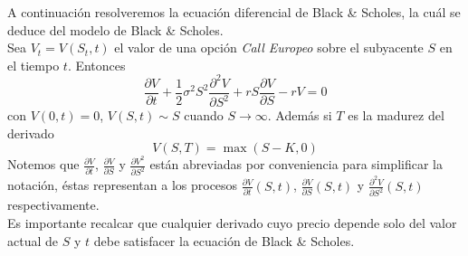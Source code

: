 \documentclass[11pt,notitlepage]{article}
\begin{document}
        A continuación resolveremos la ecuación diferencial de Black \& Scholes, la cuál se deduce del modelo de Black \& Scholes.\\
Sea $V_t = V(S_t, t)$ el valor de una opción \textit{Call Europeo} sobre el subyacente $S$ en el tiempo $t$. Entonces
\begin{equation}
    \label{eq:bs}
    \frac{\partial V}{\partial t} + \frac{1}{2} \sigma^2 S^2 \frac{\partial^2 V}{\partial S^2} + r S \frac{\partial V}{\partial S} - rV = 0
\end{equation}
con $V(0, t) = 0$, $V(S,t) \sim S$ cuando $S \to \infty$. Además si $T$ es la madurez del derivado $$V(S,T) = \max(S-K, 0)$$ 
Notemos que $\frac{\partial V}{\partial t}$, $\frac{\partial V}{\partial S}$ y $\frac{\partial V^2}{\partial S^2}$ están abreviadas por conveniencia para simplificar la notación, éstas representan a los procesos $\frac{\partial V}{\partial t} (S, t)$, $\frac{\partial V}{\partial S}(S, t)$ y $\frac{\partial^2 V}{\partial S^2}(S, t)$ respectivamente.\\
Es importante recalcar que cualquier derivado cuyo precio depende solo del valor actual de $S$ y $t$ debe satisfacer la ecuación de Black \& Scholes.
\end{document}
